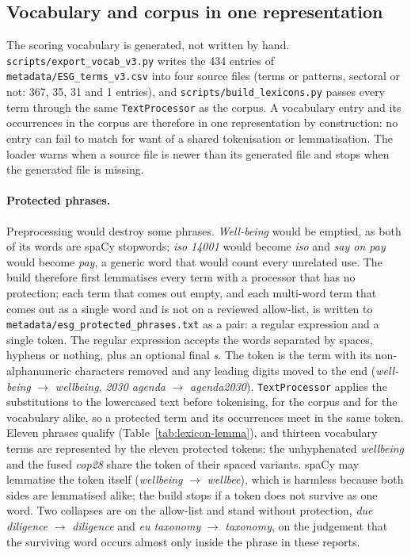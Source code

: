 \subsection{Vocabulary and corpus in one representation}
\label{sec:lexicon-represent}

The scoring vocabulary is generated, not written by hand.
\nolinkurl{scripts/export_vocab_v3.py} writes the 434 entries of
\nolinkurl{metadata/ESG_terms_v3.csv} into four source files (terms or
patterns, sectoral or not: 367, 35, 31 and 1 entries), and
\nolinkurl{scripts/build_lexicons.py} passes every term through the same
\texttt{TextProcessor} as the corpus. A vocabulary entry and its occurrences in
the corpus are therefore in one representation by construction: no entry can
fail to match for want of a shared tokenisation or lemmatisation. The loader
warns when a source file is newer than its generated file and stops when the
generated file is missing.

\paragraph{Protected phrases.} Preprocessing would destroy some phrases.
\emph{Well-being} would be emptied, as both of its words are spaCy stopwords;
\emph{iso 14001} would become \emph{iso} and \emph{say on pay} would become
\emph{pay}, a generic word that would count every unrelated use. The build
therefore first lemmatises every term with a processor that has no protection;
each term that comes out empty, and each multi-word term that comes out as a
single word and is not on a reviewed allow-list, is written to
\nolinkurl{metadata/esg_protected_phrases.txt} as a pair: a regular expression
and a single token. The regular expression accepts the words separated by
spaces, hyphens or nothing, plus an optional final \emph{s}. The token is the
term with its non-alphanumeric characters removed and any leading digits moved
to the end (\emph{well-being} $\to$ \emph{wellbeing}, \emph{2030 agenda}
$\to$ \emph{agenda2030}). \texttt{TextProcessor} applies the substitutions to
the lowercased text before tokenising, for the corpus and for the vocabulary
alike, so a protected term and its occurrences meet in the same token. Eleven
phrases qualify (Table~\ref{tab:lexicon-lemma}), and thirteen vocabulary terms
are represented by the eleven protected tokens: the unhyphenated
\emph{wellbeing} and the fused \emph{cop28} share the token of their spaced
variants. spaCy may lemmatise the token itself (\emph{wellbeing} $\to$
\emph{wellbee}), which is harmless because both sides are lemmatised alike;
the build stops if a token does not survive as one word. Two collapses are on
the allow-list and stand without protection, \emph{due diligence} $\to$
\emph{diligence} and \emph{eu taxonomy} $\to$ \emph{taxonomy}, on the judgement
that the surviving word occurs almost only inside the phrase in these reports.

